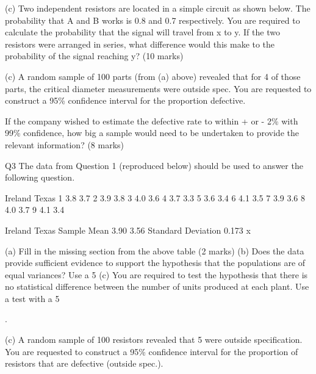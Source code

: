 \documentclass[]{report}
\begin{document}
\begin{enumerate}[(i)]
\begin{itemize}
(c)	Two independent resistors are located in a simple circuit as shown below.  The probability that A and B works is 0.8 and 0.7 respectively.  You are required to calculate the probability that the signal will travel from x to y.  If the two resistors were arranged in series, what difference would this make to the probability of the signal reaching y?
(10 marks)



(c)	A random sample of 100 parts (from (a) above) revealed that for 4 of those parts, the critical diameter measurements were outside spec.  You are requested to construct a 95\% confidence interval for the proportion defective.

If the company wished to estimate the defective rate to within + or - 2\% with 99\% confidence, how big a sample would need to be undertaken to provide the relevant information?
(8 marks)




Q3
The data from Question 1 (reproduced below) should be used to answer the following question.

Ireland	Texas
1	3.8	3.7
2	3.9	3.8
3	4.0	3.6
4	3.7	3.3
5	3.6	3.4
6	4.1	3.5
7	3.9	3.6
8	4.0	3.7
9	4.1	3.4



Ireland	Texas
Sample Mean	3.90	3.56
Standard Deviation	0.173	x

(a)	Fill in the missing section from the above table			(2 marks)
(b)	Does the data provide sufficient evidence to support the hypothesis that the populations are of equal variances?  Use a 5%
(c)	You are required to test the hypothesis that there is no statistical difference between the number of units produced at each plant.  Use a test with a 5%





.






















(c)	A random sample of 100 resistors revealed that 5 were outside specification.  You are requested to construct a 95\% confidence interval for the proportion of resistors that are defective (outside spec.).


\end{itemize}
\end{enumerate}
\end{document}
